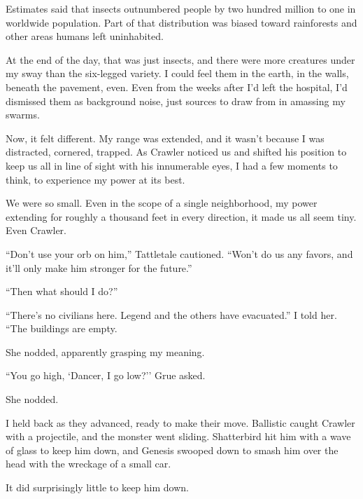 Estimates said that insects outnumbered people by two hundred million to one in worldwide population.  Part of that distribution was biased toward rainforests and other areas humans left uninhabited.



At the end of the day, that was just insects, and there were more creatures under my sway than the six-legged variety.  I could feel them in the earth, in the walls, beneath the pavement, even.  Even from the weeks after I'd left the hospital, I'd dismissed them as background noise, just sources to draw from in amassing my swarms.



Now, it felt different.  My range was extended, and it wasn't because I was distracted, cornered, trapped.  As Crawler noticed us and shifted his position to keep us all in line of sight with his innumerable eyes, I had a few moments to think, to experience my power at its best.



We were so small.  Even in the scope of a single neighborhood, my power extending for roughly a thousand feet in every direction, it made us all seem tiny.  Even Crawler.



``Don't use your orb on him,'' Tattletale cautioned.  ``Won't do us any favors, and it'll only make him stronger for the future.''



``Then what should I do?''



``There's no civilians here.  Legend and the others have evacuated.''  I told her.  ``The buildings are empty.



She nodded, apparently grasping my meaning.



``You go high, `Dancer, I go low?'' Grue asked.



She nodded.



I held back as they advanced, ready to make their move.  Ballistic caught Crawler with a projectile, and the monster went sliding.  Shatterbird hit him with a wave of glass to keep him down, and Genesis swooped down to smash him over the head with the wreckage of a small car.



It did surprisingly little to keep him down.



